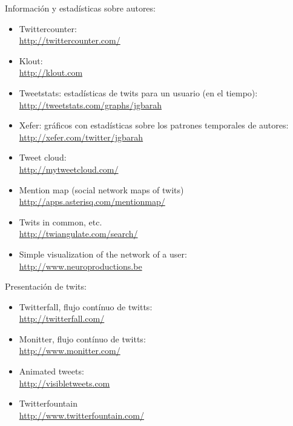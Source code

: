 \documentclass[a4paper,12pt]{article}
\begin{document}
Información y estadísticas sobre autores:

\begin{itemize}
\item Twittercounter: \\
   \url{http://twittercounter.com/}

\item Klout: \\
   \url{http://klout.com}

\item Tweetstats: estadísticas de twits para un usuario (en el tiempo): \\
  \url{http://tweetstats.com/graphs/jgbarah}

\item Xefer: gráficos con estadísticas sobre los patrones temporales de autores: \\
  \url{http://xefer.com/twitter/jgbarah}

\item Tweet cloud: \\
  \url{http://mytweetcloud.com/}

\item Mention map (social network maps of twits) \\
  \url{http://apps.asterisq.com/mentionmap/}

\item Twits in common, etc. \\
  \url{http://twiangulate.com/search/}

\item Simple visualization of the network of a user: \\
  \url{http://www.neuroproductions.be}
\end{itemize}

Presentación de twits:

\begin{itemize}
\item Twitterfall, flujo contínuo de twitts: \\
  \url{http://twitterfall.com/}

\item Monitter, flujo contínuo de twitts: \\
  \url{http://www.monitter.com/}

\item Animated tweets: \\
  \url{http://visibletweets.com}

\item Twitterfountain \\
  \url{http://www.twitterfountain.com/}
\end{itemize}
\end{document}
